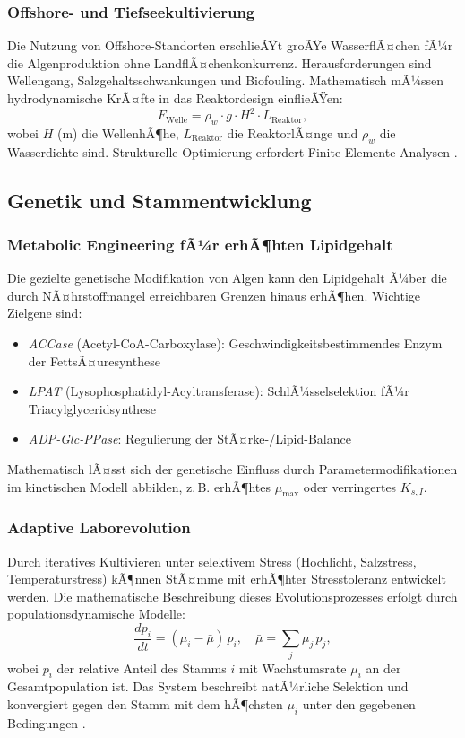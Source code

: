 ﻿\documentclass[a4paper,12pt]{article}
\theoremstyle{definition}
\begin{document}
\subsubsection{Offshore- und Tiefseekultivierung}

Die Nutzung von Offshore-Standorten erschlieÃŸt groÃŸe WasserflÃ¤chen fÃ¼r die
Algenproduktion ohne LandflÃ¤chenkonkurrenz. Herausforderungen sind
Wellengang, Salzgehaltsschwankungen und Biofouling. Mathematisch mÃ¼ssen
hydrodynamische KrÃ¤fte in das Reaktordesign einflieÃŸen:
\[
	F_\mathrm{Welle} = \rho_w \cdot g \cdot H^2 \cdot L_\mathrm{Reaktor},
\]
wobei $H$ (m) die WellenhÃ¶he, $L_\mathrm{Reaktor}$ die ReaktorlÃ¤nge und
$\rho_w$ die Wasserdichte sind. Strukturelle Optimierung erfordert
Finite-Elemente-Analysen \cite{chisti2007}.

\subsection{Genetik und Stammentwicklung}

\subsubsection{Metabolic Engineering fÃ¼r erhÃ¶hten Lipidgehalt}

Die gezielte genetische Modifikation von Algen kann den Lipidgehalt Ã¼ber
die durch NÃ¤hrstoffmangel erreichbaren Grenzen hinaus erhÃ¶hen. Wichtige
Zielgene sind:
\begin{itemize}
	\item \textit{ACCase} (Acetyl-CoA-Carboxylase): Geschwindigkeitsbestimmendes
	      Enzym der FettsÃ¤uresynthese
	\item \textit{LPAT} (Lysophosphatidyl-Acyltransferase): SchlÃ¼sselselektion
	      fÃ¼r Triacylglyceridsynthese
	\item \textit{ADP-Glc-PPase}: Regulierung der StÃ¤rke-/Lipid-Balance
\end{itemize}
Mathematisch lÃ¤sst sich der genetische Einfluss durch Parametermodifikationen
im kinetischen Modell abbilden, z.\,B. erhÃ¶htes $\mu_\mathrm{max}$ oder
verringertes $K_{s,I}$.

\subsubsection{Adaptive Laborevolution}

Durch iteratives Kultivieren unter selektivem Stress (Hochlicht, Salzstress,
Temperaturstress) kÃ¶nnen StÃ¤mme mit erhÃ¶hter Stresstoleranz entwickelt werden.
Die mathematische Beschreibung dieses Evolutionsprozesses erfolgt durch
populationsdynamische Modelle:
\[
	\frac{d p_i}{dt} = (\mu_i - \bar\mu)\,p_i,\quad \bar\mu = \sum_j \mu_j\,p_j,
\]
wobei $p_i$ der relative Anteil des Stamms $i$ mit Wachstumsrate $\mu_i$
an der Gesamtpopulation ist. Das System beschreibt natÃ¼rliche Selektion und
konvergiert gegen den Stamm mit dem hÃ¶chsten $\mu_i$ unter den gegebenen
Bedingungen \cite{richmond2004}.
\end{document}
